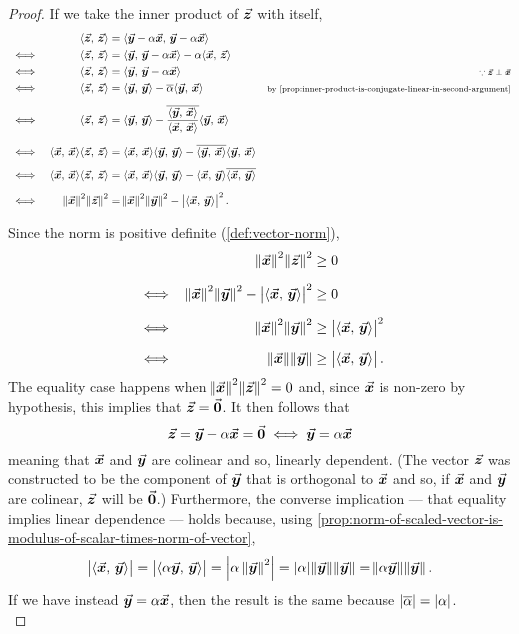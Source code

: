 \documentclass[../MathsNotesBase.tex]{subfiles}
\begin{document}
{\begin{proof}
			If we take the inner product of $\vec{\bm{z}}$ with itself,
			\[\begin{aligned}
				&& \inner{\z}{\z} &= \inner{\y - \alpha \x}{\y - \alpha \x} \\
				&\iff & \inner{\z}{\z} &= \inner{\y}{\y - \alpha \x} - \alpha \inner{\x}{\z} \\
				&\iff & \inner{\z}{\z} &= \inner{\y}{\y - \alpha \x} &\sidecomment{${ \because \z \perp \x }$} \\
				&\iff & \inner{\z}{\z} &= \inner{\y}{\y} - \conj{\alpha} \inner{\y}{\x} &\sidecomment{by \ref{prop:inner-product-is-conjugate-linear-in-second-argument}} \nn
				&\iff & \inner{\z}{\z} &= \inner{\y}{\y} - \conj{\frac{ \inner{\y}{\x} }{ \inner{\x}{\x} }} \inner{\y}{\x} \nn
				&\iff & \inner{\x}{\x} \inner{\z}{\z} &= \inner{\x}{\x} \inner{\y}{\y} - \conj{\inner{\y}{\x}} \inner{\y}{\x} \nn
				&\iff & \inner{\x}{\x} \inner{\z}{\z} &= \inner{\x}{\x} \inner{\y}{\y} - \inner{\x}{\y} \conj{\inner{\x}{\y}} \nn
				&\iff & \norm{\x}^2 \norm{\z}^2 &= \norm{\x}^2 \norm{\y}^2 - \modulus{\inner{\x}{\y}}^2.
			\end{aligned}\]
			
			Since the norm is positive definite (\ref{def:vector-norm}), 
			\[\begin{aligned}
				&& \norm{\x}^2 \norm{\z}^2 &\geq 0  \nn
				&\iff & \norm{\x}^2 \norm{\y}^2 - \modulus{\inner{\x}{\y}}^2 &\geq 0  \nn
				&\iff & \norm{\x}^2 \norm{\y}^2 &\geq \modulus{\inner{\x}{\y}}^2 \nn
				&\iff & \norm{\x} \norm{\y} &\geq \modulus{\inner{\x}{\y}}.
			\end{aligned}\]
			The equality case happens when ${ \norm{\vec{\bm{x}}}^2 \norm{\vec{\bm{z}}}^2 = 0 }$ and, since $\vec{\bm{x}}$ is non-zero by hypothesis, this implies that ${ \vec{\bm{z}} = \vec{\bm{0}} }$. It then follows that
			\[ \vec{\bm{z}} = \vec{\bm{y}} - \alpha \vec{\bm{x}} = \vec{\bm{0}} \iff \vec{\bm{y}} = \alpha \vec{\bm{x}}  \]
			meaning that $\vec{\bm{x}}$ and $\vec{\bm{y}}$ are colinear and so, linearly dependent. (The vector $\vec{\bm{z}}$ was constructed to be the component of $\vec{\bm{y}}$ that is orthogonal to $\vec{\bm{x}}$ and so, if $\vec{\bm{x}}$ and $\vec{\bm{y}}$ are colinear, $\vec{\bm{z}}$ will be $\vec{\bm{0}}$.) Furthermore, the converse implication --- that equality implies linear dependence --- holds because, using \autoref{prop:norm-of-scaled-vector-is-modulus-of-scalar-times-norm-of-vector},
			\[ \left\lvert\langle \vec{\bm{x}},\, \vec{\bm{y}} \rangle\right\rvert = \left\lvert\langle \alpha \vec{\bm{y}},\, \vec{\bm{y}} \rangle\right\rvert = \left\lvert\alpha \, \norm{\vec{\bm{y}}}^2\right\rvert = \left\lvert\alpha\right\rvert \norm{\vec{\bm{y}}} \norm{\vec{\bm{y}}} = \norm{\alpha\vec{\bm{y}}} \norm{\vec{\bm{y}}}. \]
			If we have instead ${ \vec{\bm{y}} = \alpha \vec{\bm{x}} }$, then the result is the same because ${ \left\lvert\overline{\alpha}\right\rvert = \left\lvert\alpha\right\rvert }$.\\
			

\end{proof}}
\end{document}
